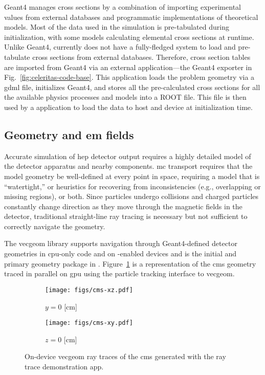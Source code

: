Geant4 manages cross sections by a combination of importing experimental values
from external databases and programmatic implementations of theoretical models.
Most of the data used in the simulation is pre-tabulated during initialization,
with some models calculating elemental cross sections at runtime. Unlike Geant4,
\celeritas currently does not have a fully-fledged system to load and
pre-tabulate cross sections from external databases. Therefore, cross section
tables are imported from Geant4 via an external application---the Geant4
exporter in Fig.~\ref{fig:celeritas-code-base}. This application loads the
problem geometry via a \acs{gdml} file, initializes Geant4, and stores all the
pre-calculated cross sections for all the available physics processes and models
into a ROOT file. This file is then used by a \celeritas application to load the
data to host and device at initialization time.

\subsection{Geometry and \ac{em} fields}

Accurate simulation of \ac{hep} detector output requires a highly detailed model
of the detector apparatus and nearby components. \ac{mc} transport requires that
the model geometry be well-defined at every point in space, requiring a model
that is ``watertight,'' or heuristics for recovering from inconsistencies (e.g.,
overlapping or missing regions), or both. Since particles undergo collisions and
charged particles constantly change direction as they move through the magnetic
fields in the detector, traditional straight-line ray tracing is necessary but
not sufficient to correctly navigate the geometry.

The \acs{vecgeom} library supports navigation through Geant4-defined detector
geometries in \ac{cpu}-only code and on \cuda-enabled devices
\cite{apostolakis_towards_2015} and is the initial and primary geometry package
in \celeritas. Figure~\ref{fig:vecgeom-cms} is a representation of the \ac{cms}
geometry traced in parallel on \ac{gpu} using the \celeritas particle tracking
interface to \acs{vecgeom}.
\begin{figure}
  \centering%
  \begin{subfigure}{3in}%
    \centering%
    \texttt{[image: figs/cms-xz.pdf]}%
    \caption{$y=0$ [cm]}%
  \end{subfigure}%
  \begin{subfigure}{3in}%
    \centering%
    \texttt{[image: figs/cms-xy.pdf]}%
    \caption{$z=0$ [cm]}%
  \end{subfigure}
  \caption{On-device \acs{vecgeom} ray traces of the \acs{cms} generated with
the \celeritas ray trace demonstration app.}
\label{fig:vecgeom-cms}
\end{figure}

